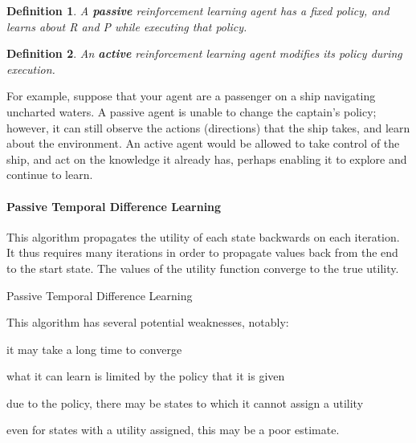 \documentclass[10pt,a4paper]{article}
\newtheorem{defin}{Definition}
\newenvironment{itemize_packed}{
\begin{itemize}
\setlength{\itemsep}{0pt}
\setlength{\parskip}{0pt}
}{\end{itemize}}
\begin{document}
\begin{defin}
A \emph{\textbf{passive}} reinforcement learning agent has a fixed policy, and learns about R and P while executing that policy.
\end{defin}

\begin{defin}
An \textbf{active} reinforcement learning agent modifies its policy during execution.
\end{defin}

For example, suppose that your agent are a passenger on a ship navigating uncharted waters. A passive agent is unable to change the captain's policy; however, it can still observe the actions (directions) that the ship takes, and learn about the environment. An active agent would be allowed to take control of the ship, and act on the knowledge it already has, perhaps enabling it to explore and continue to learn.

\paragraph{Passive Temporal Difference Learning} This algorithm propagates the utility of each state backwards on each iteration. It thus requires many iterations in order to propagate values back from the end to the start state. The values of the utility function converge to the true utility.

\begin{algorithm}
\caption{Passive Temporal Difference Learning}
\begin{algorithmic}[1]
\ENDIF
{}
\ENDIF
\end{algorithmic}
\end{algorithm}

This algorithm has several potential weaknesses, notably:
\begin{itemize_packed}
\item it may take a long time to converge
\item what it can learn is limited by the policy that it is given
\item due to the policy, there may be states to which it cannot assign a utility
\item even for states with a utility assigned, this may be a poor estimate.
\end{itemize_packed}
\end{document}

